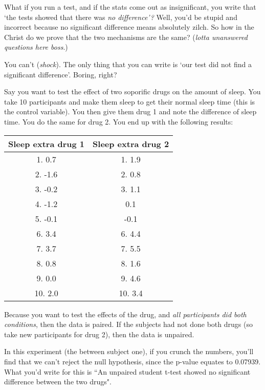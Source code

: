 \documentclass[11pt,a4paper,titlepage]{scrartcl}
\begin{document}
What if you run a test, and if the stats come out as insignificant, you
write that `the tests showed that there was \textit{no difference'?} Well,
you'd be stupid and incorrect because no significant difference means
absolutely zilch. So how in the Christ do we prove that the two mechanisms
are the same? (\textit{lotta unanswered questions here boss}.)

You can't (\textit{shock}). The only thing that you can write is `our test
did not find a significant difference'. Boring, right?

Say you want to test the effect of two soporific drugs on the amount of
sleep. You take 10 participants and make them sleep to get their normal
sleep time (this is the control variable). You then give them drug 1
and note the difference of sleep time. You do the same for drug 2. You end
up with the following results:
\begin{center}
    \begin{tabular}{c|c}
        \textbf{Sleep extra drug 1} & \textbf{Sleep extra drug 2} \\
        \hline
        1. 0.7 & 1. 1.9 \\
        \hline
        2. -1.6 & 2. 0.8 \\
        \hline
        3. -0.2 & 3. 1.1 \\
        \hline
        4. -1.2 & 0.1 \\
        \hline
        5. -0.1 & -0.1 \\
        \hline
        6. 3.4 & 6. 4.4 \\
        \hline
        7. 3.7 &  7. 5.5 \\
        \hline
        8. 0.8 & 8. 1.6 \\ \hline
        9. 0.0 & 9. 4.6 \\ \hline
        10. 2.0 & 10. 3.4 
    \end{tabular}
\end{center}

Because you want to test the effects of the drug, and \textit{all
participants did both conditions}, then the data is paired. If the
subjects had not done both drugs (so take new participants for drug 2),
then the data is unpaired.

In this experiment (the between subject one), if you crunch the numbers,
you'll find that we can't
reject the null hypothesis, since the p-value equates to 0.07939. What
you'd write for this is ``An unpaired student t-test showed no significant
difference between the two drugs".
\end{document}
